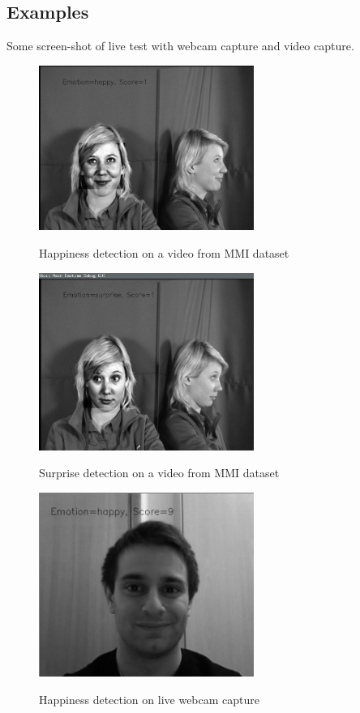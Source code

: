\subsection{Examples}

Some screen-shot of live test with webcam capture and video capture.

\begin{figure}
\centering
\includegraphics[width=7cm]{images/example_happy3.png}
\label{fig:example_happy3}
\caption{Happiness detection on a video from MMI dataset}
\end{figure}

\begin{figure}
\centering
\includegraphics[width=7cm]{images/example_surprise.png}
\label{fig:example_surprise}
\caption{Surprise detection on a video from MMI dataset}
\end{figure}

\begin{figure}
\centering
\includegraphics[width=7cm]{images/example_happy1.png}
\label{fig:example_happy1}
\caption{Happiness detection on live webcam capture}
\end{figure}

